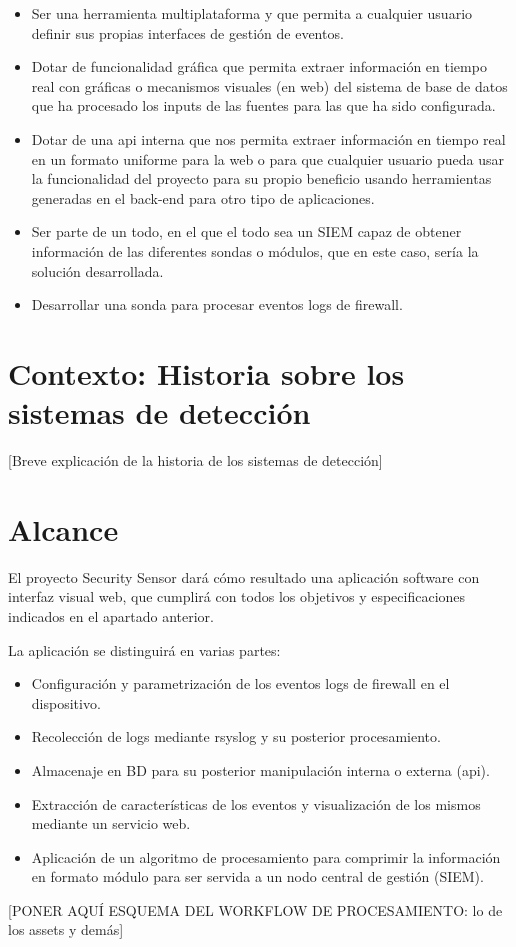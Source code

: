 \begin{itemize}
\item Ser una herramienta multiplataforma y que permita a cualquier usuario definir sus propias interfaces de gestión de eventos.
\item Dotar de funcionalidad gráfica que permita extraer información en tiempo real con gráficas o mecanismos visuales (en web) del sistema de base de datos que ha procesado los inputs de las fuentes para las que ha sido configurada.
\item Dotar de una api interna que nos permita extraer información en tiempo real en un formato uniforme para la web o para que cualquier usuario pueda usar la funcionalidad del proyecto para su propio beneficio usando herramientas generadas en el back-end para otro tipo de aplicaciones.
\item Ser parte de un todo, en el que el todo sea un SIEM capaz de obtener información de las diferentes sondas o módulos, que en este caso, sería la solución desarrollada.
\item Desarrollar una sonda para procesar eventos logs de firewall.
\end{itemize}

\section{Contexto: Historia sobre los sistemas de detección}
[Breve explicación de la historia de los sistemas de detección]

\section{Alcance}

El proyecto Security Sensor dará cómo resultado una aplicación software con interfaz visual web, que cumplirá con todos los objetivos y especificaciones indicados en el apartado anterior.

La aplicación se distinguirá en varias partes:
\begin{itemize}
\item Configuración y parametrización de los eventos logs de firewall en el dispositivo.
\item Recolección de logs mediante rsyslog y su posterior procesamiento.
\item Almacenaje en BD para su posterior manipulación interna o externa (api).
\item Extracción de características de los eventos y visualización de los mismos mediante un servicio web.
\item Aplicación de un algoritmo de procesamiento para comprimir la información en formato módulo para ser servida a un nodo central de gestión (SIEM).
\end{itemize}
[PONER AQUÍ ESQUEMA DEL WORKFLOW DE PROCESAMIENTO: lo de los assets y demás]
    
